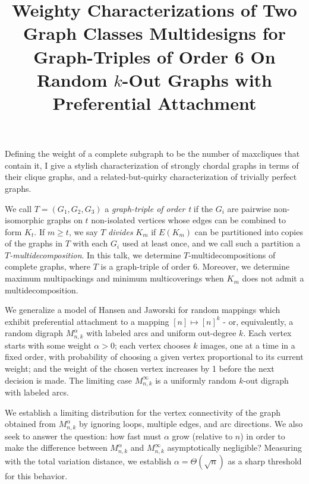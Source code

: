 \documentclass{article}
\begin{document}
\title{ Weighty Characterizations of Two Graph Classes}
\endtitle
Defining the weight of a complete subgraph to be the number of
maxcliques that contain it, I give a stylish characterization of strongly
chordal graphs in terms of their clique graphs, and a related-but-quirky
characterization of trivially perfect graphs. 


\vspace{.25in}

\title{ Multidesigns for Graph-Triples of Order 6 }
\endtitle
We call $T=(G_1,G_2,G_3)$ a \emph{graph-triple of order t} if the
$G_i$ are pairwise non-isomorphic graphs on $t$ non-isolated vertices whose
edges can be combined to form $K_t$.  If $m \geq t$, we say $T$
\emph{divides} $K_m$ if $E(K_m)$ can be partitioned into copies of the
graphs in $T$ with each $G_i$ used at least once, and we call such a
partition a \emph{$T$-multidecomposition}.  In this talk, we determine
$T$-multidecompositions of complete graphs, where $T$ is a graph-triple of
order 6. Moreover, we determine maximum multipackings and minimum
multicoverings when $K_m$ does not admit a multidecomposition. 


\vspace{.25in}

\title{  On Random $k$-Out Graphs with Preferential Attachment }
\endtitle
We generalize a model of Hansen and Jaworski for random mappings
which exhibit preferential attachment to a mapping $[n]\mapsto[n]^k$ - or,
equivalently, a random digraph $M_{n,k}^{\alpha}$ with labeled arcs and
uniform out-degree $k$. Each vertex starts with some weight $\alpha>0$; each
vertex chooses $k$ images, one at a time in a fixed order, with probability
of choosing a given vertex proportional to its current weight; and the
weight of the chosen vertex increases by 1 before the next decision is made.
The limiting case $M_{n,k}^{\infty}$ is a uniformly random $k$-out digraph
with labeled arcs.

We establish a limiting distribution for the vertex connectivity of the
graph obtained from $M_{n,k}^{\alpha}$ by ignoring loops, multiple edges,
and arc directions. We also seek to answer the question: how fast must
$\alpha$ grow (relative to $n$) in order to make the difference between
$M_{n,k}^{\alpha}$ and $M_{n,k}^{\infty}$ asymptotically negligible?
Measuring with the total variation distance, we establish
$\alpha=\Theta(\sqrt{n})$ as a sharp threshold for this behavior.
\end{document}
